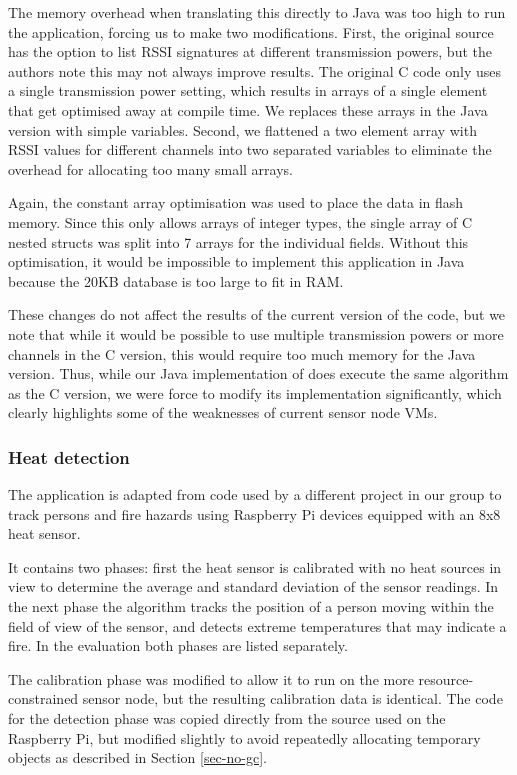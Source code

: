 The memory overhead when translating this directly to Java was too high to run the application, forcing us to make two modifications. First, the original source has the option to list RSSI signatures at different transmission powers, but the authors note this may not always improve results. The original C code only uses a single transmission power setting, which results in arrays of a single element that get optimised away at compile time. We replaces these arrays in the Java version with simple variables. Second, we flattened a two element array with RSSI values for different channels into two separated variables to eliminate the overhead for allocating too many small arrays.

Again, the constant array optimisation was used to place the data in flash memory. Since this only allows arrays of integer types, the single array of C nested structs was split into 7 arrays for the individual fields. Without this optimisation, it would be impossible to implement this application in Java because the 20KB database is too large to fit in RAM.

These changes do not affect the results of the current version of the code, but we note that while it would be possible to use multiple transmission powers or more channels in the C version, this would require too much memory for the Java version. Thus, while our Java implementation of  does execute the same algorithm as the C version, we were force to modify its implementation significantly, which clearly highlights some of the weaknesses of current sensor node VMs.

\subsubsection{Heat detection}
The  application is adapted from code used by a different project in our group to track persons and fire hazards using Raspberry Pi devices equipped with an 8x8 heat sensor.

It contains two phases: first the heat sensor is calibrated with no heat sources in view to determine the average and standard deviation of the sensor readings. In the next phase the algorithm tracks the position of a person moving within the field of view of the sensor, and detects extreme temperatures that may indicate a fire. In the evaluation both phases are listed separately.

The calibration phase was modified to allow it to run on the more resource-constrained sensor node, but the resulting calibration data is identical. The code for the detection phase was copied directly from the source used on the Raspberry Pi, but modified slightly to avoid repeatedly allocating temporary objects as described in Section \ref{sec-no-gc}.

